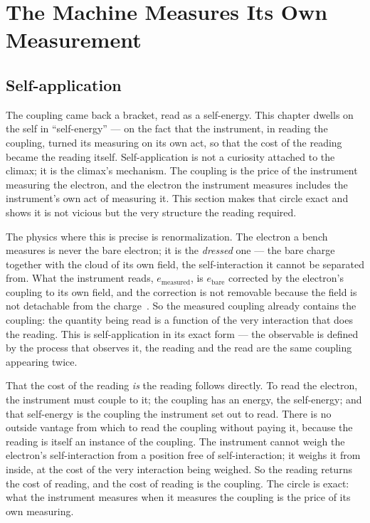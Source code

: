 \chapter{The Machine Measures Its Own Measurement}

\section{Self-application}

The coupling came back a bracket, read as a self-energy. This chapter dwells on the self in ``self-energy'' --- on the fact
that the instrument, in reading the coupling, turned its measuring on its own act, so that the cost of the reading became the
reading itself. Self-application is not a curiosity attached to the climax; it is the climax's mechanism. The coupling is the
price of the instrument measuring the electron, and the electron the instrument measures includes the instrument's own act of
measuring it. This section makes that circle exact and shows it is not vicious but the very structure the reading required.

The physics where this is precise is renormalization. The electron a bench measures is never the bare electron; it is the
\emph{dressed} one --- the bare charge together with the cloud of its own field, the self-interaction it cannot be separated
from. What the instrument reads, $e_{\text{measured}}$, is $e_{\text{bare}}$ corrected by the electron's coupling to its own
field, and the correction is not removable because the field is not detachable from the charge~\cite{feynman1948}. So the
measured coupling already contains the coupling: the quantity being read is a function of the very interaction that does the
reading. This is self-application in its exact form --- the observable is defined by the process that observes it, the
reading and the read are the same coupling appearing twice.

That the cost of the reading \emph{is} the reading follows directly. To read the electron, the instrument must couple to it;
the coupling has an energy, the self-energy; and that self-energy is the coupling the instrument set out to read. There is no
outside vantage from which to read the coupling without paying it, because the reading is itself an instance of the coupling.
The instrument cannot weigh the electron's self-interaction from a position free of self-interaction; it weighs it from
inside, at the cost of the very interaction being weighed. So the reading returns the cost of reading, and the cost of
reading is the coupling. The circle is exact: what the instrument measures when it measures the coupling is the price of its
own measuring.

